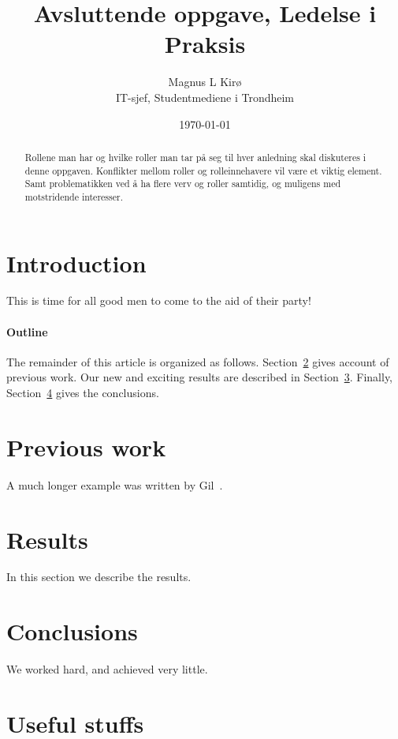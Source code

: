 \documentclass[12pt, a4paper]{article}
\title{
	Avsluttende oppgave, Ledelse i Praksis
}
\author{
	Magnus L Kirø \\
	IT-sjef, Studentmediene i Trondheim
}
\date{\today}
\begin{document}
\maketitle
{}

\begin{abstract}
Rollene man har og hvilke roller man tar på seg til hver anledning skal
diskuteres i denne oppgaven. Konflikter mellom roller og rolleinnehavere vil
være et viktig element. Samt problematikken ved å ha flere verv og roller
samtidig, og muligens med motstridende interesser. 
\end{abstract}

\section{Introduction}
This is time for all good men to come to the aid of their party!

\paragraph{Outline}
The remainder of this article is organized as follows.
Section~\ref{previous work} gives account of previous work.
Our new and exciting results are described in Section~\ref{results}.
Finally, Section~\ref{conclusions} gives the conclusions.

\section{Previous work}\label{previous work}
A much longer \LaTeXe{} example was written by Gil~\cite{Gil:02}.

\section{Results}\label{results}
In this section we describe the results.

\section{Conclusions}\label{conclusions}
We worked hard, and achieved very little.

\section{Useful stuffs}
\end{document}
